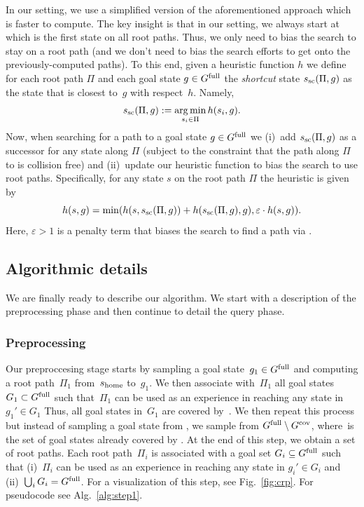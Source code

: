 \documentclass[conference]{IEEEtran}
\DeclareMathOperator*{\argmin}{arg\,min}
\begin{document}
In our setting, we use a simplified version of the aforementioned approach which is faster to compute.
%
The key insight is that in our setting, we always start at \Shome which is the first state on all root paths. Thus, we only need to bias the search to stay on a root path (and we don't need to bias the search efforts to get onto the previously-computed paths).
%
To this end, given a heuristic function $h$ we define for each root path $\Pi$ and each goal state $g \in G^{\textrm{full}}$ the \emph{shortcut} state $s_{\textrm{sc}} (\Pi,g)$ as the   state that is closest to~$g$ with respect~$h$.
Namely,
$$
\Ssc (\Pi,g) := \argmin\limits_{s_i \in \Pi} h(s_i, g).
$$
Now, when searching for a path to a goal state $g \in G^{\textrm{full}}$ we
(i)~add $s_{\textrm{sc}} (\Pi,g)$ as a successor for any state along $\Pi$
(subject to the constraint that the path along $\Pi$ to \Ssc is collision free)
and
(ii)~update our heuristic function to bias the search to use root paths. Specifically, for any state $s$ on the root path $\Pi$ the heuristic is given by
$$
h(s,g) = \min(h(s,s_{\textrm{sc}} (\Pi,g)) + h(s_{\textrm{sc}} (\Pi,g),g), \varepsilon \cdot h(s,g)).
$$
Here, $\varepsilon>1$ is a penalty term that biases the search to find a path via \Ssc.





\subsection{Algorithmic details}
We are finally ready to describe our algorithm. We start with a description of the preprocessing phase and then continue to detail the query phase.

\subsubsection{Preprocessing}
Our preproccesing stage starts by sampling a goal state~$g_1 \in G^{\textrm{full}}$ and computing a root path~$\Pi_1$ from~$s_{\textrm{home}}$ to~$g_1$. We then associate with~$\Pi_1$ all goal states~$G_1 \subset G^{\textrm{full}}$ such that~$\Pi_1$ can be used as an experience in reaching any state in $g_1' \in G_1$ 
Thus, all goal states in~$G_1$ are covered by~\Shome.
%
We then repeat this process but instead of sampling  a goal state from \Gfull, we sample from $G^{\textrm{full}} \setminus G^{\textrm{cov}}$, where~\Gcov is the set of goal states already covered by \Shome.
At the end of this step, we obtain a set of root paths. 
Each root path~$\Pi_i$ is associated with a goal set $G_i \subseteq G^{\textrm{full}}$ such that 
(i)~$\Pi_i$ can be used as an experience in reaching any state in $g_i' \in G_i$ and 
(ii)~$\bigcup_i G_i = G^{\textrm{full}}$.
%
For a visualization of this step, see Fig.~\ref{fig:crp}.
For pseudocode see Alg.~\ref{alg:step1}.
\end{document}
